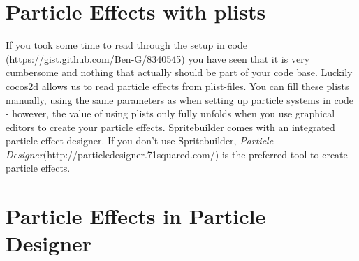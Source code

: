 \documentclass{scrreprt}
\newcommand{\cocos}{cocos2d}
\begin{document}
\section{Particle Effects with plists}
If you took some time to read through the setup in code
(https://gist.github.com/Ben-G/8340545) you have seen that it is very cumbersome
and nothing that actually should be part of your code base. Luckily \cocos{}
allows us to read particle effects from plist-files. You can fill these plists
manually, using the same parameters as when setting up particle systems in code
- however, the value of using plists only fully unfolds when you use graphical
editors to create your particle effects. Spritebuilder comes with an integrated
particle effect designer. If you don't use Spritebuilder, \textit{Particle
Designer}(http://particledesigner.71squared.com/) is the preferred tool to
create particle effects.
\section{Particle Effects in Particle Designer}
\end{document}
